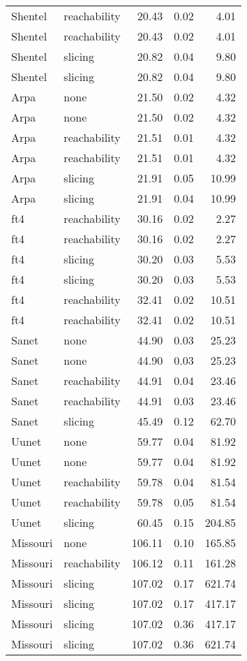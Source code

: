 \begin{tabular}{llrrr}
Shentel & reachability & 20.43 & 0.02 & 4.01 \\
Shentel & reachability & 20.43 & 0.02 & 4.01 \\
Shentel & slicing & 20.82 & 0.04 & 9.80 \\
Shentel & slicing & 20.82 & 0.04 & 9.80 \\
Arpa & none & 21.50 & 0.02 & 4.32 \\
Arpa & none & 21.50 & 0.02 & 4.32 \\
Arpa & reachability & 21.51 & 0.01 & 4.32 \\
Arpa & reachability & 21.51 & 0.01 & 4.32 \\
Arpa & slicing & 21.91 & 0.05 & 10.99 \\
Arpa & slicing & 21.91 & 0.04 & 10.99 \\
ft4 & reachability & 30.16 & 0.02 & 2.27 \\
ft4 & reachability & 30.16 & 0.02 & 2.27 \\
ft4 & slicing & 30.20 & 0.03 & 5.53 \\
ft4 & slicing & 30.20 & 0.03 & 5.53 \\
ft4 & reachability & 32.41 & 0.02 & 10.51 \\
ft4 & reachability & 32.41 & 0.02 & 10.51 \\
Sanet & none & 44.90 & 0.03 & 25.23 \\
Sanet & none & 44.90 & 0.03 & 25.23 \\
Sanet & reachability & 44.91 & 0.04 & 23.46 \\
Sanet & reachability & 44.91 & 0.03 & 23.46 \\
Sanet & slicing & 45.49 & 0.12 & 62.70 \\
Uunet & none & 59.77 & 0.04 & 81.92 \\
Uunet & none & 59.77 & 0.04 & 81.92 \\
Uunet & reachability & 59.78 & 0.04 & 81.54 \\
Uunet & reachability & 59.78 & 0.05 & 81.54 \\
Uunet & slicing & 60.45 & 0.15 & 204.85 \\
Missouri & none & 106.11 & 0.10 & 165.85 \\
Missouri & reachability & 106.12 & 0.11 & 161.28 \\
Missouri & slicing & 107.02 & 0.17 & 621.74 \\
Missouri & slicing & 107.02 & 0.17 & 417.17 \\
Missouri & slicing & 107.02 & 0.36 & 417.17 \\
Missouri & slicing & 107.02 & 0.36 & 621.74 \\

\end{tabular}
